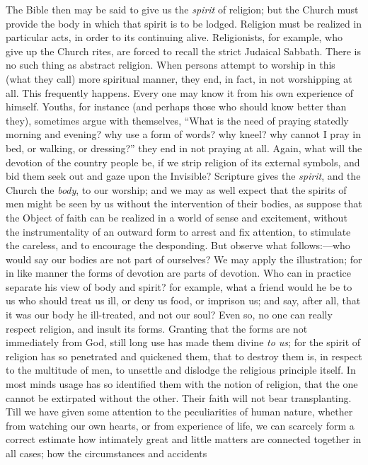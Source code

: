The Bible then may be said to give us the \emph{spirit} of
religion; but the Church must provide the body in which that spirit is
to be lodged. Religion must be realized in particular acts, in order
to its continuing alive. Religionists, for example, who give up the
Church rites, are forced to recall the strict Judaical Sabbath. There
is no such thing as abstract religion. When persons attempt to worship
in this (what they call) more spiritual manner, they end, in fact, in
not worshipping at all. This frequently happens. Every one may know it
from his own experience of himself. Youths, for instance (and perhaps
those who should know better than they), sometimes argue with
themselves, ``What is the need of praying statedly morning and
evening? why use a form of words? why kneel? why cannot I pray in bed,
or walking, or dressing?'' they end in not praying at all. Again,
what will the devotion of the country people be, if we strip religion
of its external symbols, and bid them seek out and gaze upon the
Invisible? Scripture gives the \emph{spirit}, and the Church the \emph{body},
to our worship; and we may as well expect that the spirits of men
might be seen by us without the intervention of their bodies, as
suppose that the Object of faith can be realized in a world of sense
and excitement, without the instrumentality of an outward form to
arrest and fix attention, to stimulate the careless, and to encourage
the desponding. But observe what follows:—who would say our bodies
are not part of ourselves? We may apply the illustration; for in like
manner the forms of devotion are parts of devotion. Who can in
practice separate his view of body and spirit? for example, what a
friend would he be to us who should treat us ill, or deny us food, or
imprison us; and say, after all, that it was our body he ill-treated,
and not our soul? Even so, no one can really respect religion, and
insult its forms. Granting that the forms are not immediately from
God, still long use has made them divine \emph{to us}; for the spirit of
religion has so penetrated and quickened them, that to destroy them
is, in respect to the multitude of men, to unsettle and dislodge the
religious principle itself. In most minds usage has so identified them
with the notion of religion, that the one cannot be extirpated without
the other. Their faith will not bear transplanting. Till we have given
some attention to the peculiarities of human nature, whether from
watching our own hearts, or from experience of life, we can scarcely
form a correct estimate how intimately great and little matters are
connected together in all cases; how the circumstances and accidents
